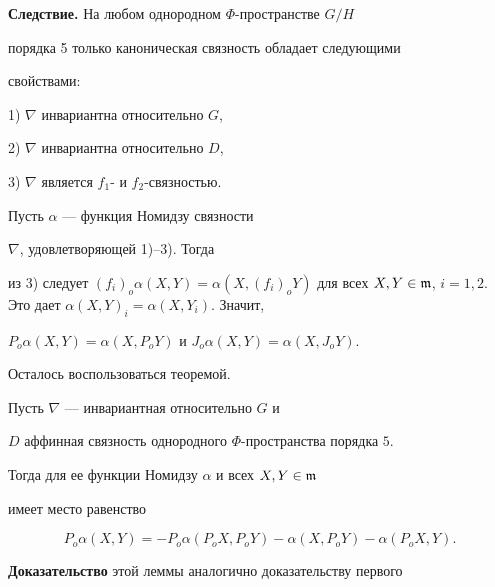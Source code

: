 {\bf Следствие.} На любом однородном $\Phi$-пространстве $G/H$


порядка 5 только каноническая связность обладает следующими


свойствами:





1) $\nabla$ инвариантна относительно $G$,





2) $\nabla$ инвариантна относительно $D$,





3) $\nabla$ является $f_1$- и $f_2$-связностью.





\begin{pf}


Пусть $\alpha$ --- функция Номидзу связности


$\nabla$, удовлетворяющей 1)--3). Тогда


из 3) следует $(f_i)_o\alpha(X,Y)=\alpha(X,(f_i)_oY)$ для всех $X,Y \in


\frak{m}$, $i=1,2$. Это дает $\alpha(X,Y)_i=\alpha(X,Y_i)$. Значит,


$P_o\alpha(X,Y)=\alpha(X,P_oY)$ и $J_o\alpha(X,Y)=\alpha(X,J_oY)$.


Осталось воспользоваться теоремой.


\end{pf}





\begin{lem}


Пусть $\nabla$ --- инвариантная относительно $G$ и


$D$ аффинная связность однородного $\Phi$-пространства порядка $5$.


Тогда для ее функции Номидзу $\alpha$ и всех $X,Y \in \frak{m}$


имеет место равенство


$$


P_o\alpha(X,Y)=-P_o\alpha(P_oX,P_oY)-\alpha(X,P_oY)-\alpha(P_oX,Y).


$$


\end{lem}





{\bf Доказательство} этой леммы аналогично доказательству первого 


